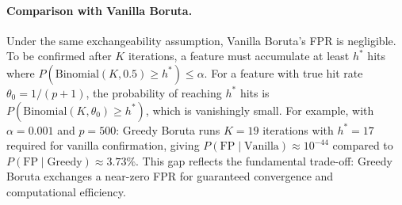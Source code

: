 \documentclass[runningheads]{llncs}
\begin{document}
\paragraph{Comparison with Vanilla Boruta.}
Under the same exchangeability assumption, Vanilla Boruta's FPR is negligible. To be confirmed after $K$ iterations, a feature must accumulate at least $h^*$ hits where $P(\mathrm{Binomial}(K, 0.5) \geq h^*) \leq \alpha$. For a feature with true hit rate $\theta_0 = 1/(p+1)$, the probability of reaching $h^*$ hits is $P(\mathrm{Binomial}(K, \theta_0) \geq h^*)$, which is vanishingly small. For example, with $\alpha = 0.001$ and $p = 500$: Greedy Boruta runs $K = 19$ iterations with $h^* = 17$ required for vanilla confirmation, giving $P(\text{FP} \mid \text{Vanilla}) \approx 10^{-44}$ compared to $P(\text{FP} \mid \text{Greedy}) \approx 3.73\%$. This gap reflects the fundamental trade-off: Greedy Boruta exchanges a near-zero FPR for guaranteed convergence and computational efficiency.
\end{document}

